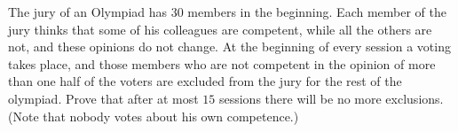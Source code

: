 The jury of an Olympiad has $30$ members in the beginning. Each member of the jury thinks that some of his colleagues are competent, while all the others are not, and these opinions do not change. At the beginning of every session a voting takes place, and those members who are not competent in the opinion of more than one half of the voters are excluded from the jury for the rest of the olympiad. Prove that after at most $15$ sessions there will be no more exclusions. (Note that nobody votes about his own competence.)